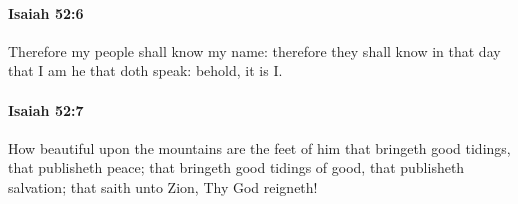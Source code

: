 		\paragraph{Isaiah 52:6} %
			\label{ISAIAH-52-6}

			Therefore my people shall know my name: therefore they shall know in that day that I am he that doth speak: behold, it is I.


		\paragraph{Isaiah 52:7} %
			\label{ISAIAH-52-7}

			How beautiful upon the mountains are the feet of him that bringeth good tidings, that publisheth peace; that bringeth good tidings of good, that publisheth salvation; that saith unto Zion, Thy God reigneth!



